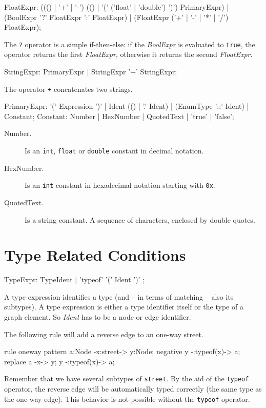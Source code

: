 \begin{rail}  
  FloatExpr: ((() | '+' | '-') (() | '(' ('float' | 'double') ')') PrimaryExpr) | (BoolExpr '?' FloatExpr ':' FloatExpr) | (FloatExpr ('+' | '-' | '*' | '/') FloatExpr);
\end{rail} 
The \texttt{?} operator is a simple if-then-else: if the \emph{BoolExpr} is evaluated to \texttt{true}, the operator returns the first \emph{FloatExpr}, otherwise it returns the second \emph{FloatExpr}.

\begin{rail}
  StringExpr: PrimaryExpr | StringExpr '+' StringExpr;
\end{rail}
The operator \texttt{+} concatenates two strings.

\begin{rail} 
  PrimaryExpr: '(' Expression ')' | Ident (() | '.' Ident) | (EnumType '::' Ident) | Constant;
  Constant: Number | HexNumber | QuotedText | 'true' | 'false';
\end{rail}
\begin{description}
  \item[Number.] Is an \texttt{int}, \texttt{float} or \texttt{double} constant in decimal notation.
  \item[HexNumber.] Is an \texttt{int} constant in hexadecimal notation starting with \texttt{0x}.
  \item[QuotedText.] Is a string constant. A sequence of characters, enclosed by double quotes.
\end{description} 

\section{Type Related Conditions}
\label{typeexpressions}

\begin{rail}
  TypeExpr: TypeIdent | 'typeof' '(' Ident ')' ;
\end{rail}
A type expression identifies a type (and -- in terms of matching -- also its subtypes). A type expression is either a type identifier itself or the type of a graph element. So \emph{Ident} has to be a node or edge identifier.
\begin{example}
The following rule will add a reverse edge to an one-way street.
\begin{grgen}
rule oneway {
    pattern{
        a:Node -x:street-> y:Node;
        negative{
            y -:typeof(x)-> a;
        }
    } 
    replace{
      a -x-> y;
      y -:typeof(x)-> a;
    }
}
\end{grgen}
Remember that we have several subtypes of \texttt{street}. By the aid of the \texttt{typeof} operator, the reverse edge will be automatically typed correctly (the same type as the one-way edge). This behavior is not possible without the \texttt{typeof} operator.
\end{example}

